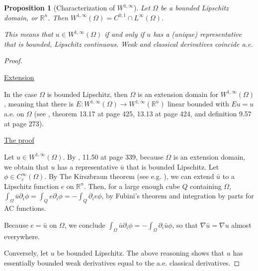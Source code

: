 \documentclass[english,a4paper,12pt,oneside]{scrbook}
\theoremstyle{break}
\newtheorem{prop}[equation]{Proposition}
\newenvironment{mproof}[1][\proofname]{%
  \begin{proof}[#1]$ $\par\nobreak\ignorespaces
}{%
  \end{proof}
}
\renewcommand*{\proofname}{Proof}
\theoremstyle{remark}
\newcommand{\ds}{\displaystyle}
\newcommand{\cc}{\subset\subset}
\begin{document}
\begin{prop}[Characterization of $W^{1,\infty}$]
\label{prop:lip}
Let $\Omega$ be a bounded Lipschitz domain, or $\mathbb{R}^n$. Then $W^{1,\infty}(\Omega) = C^{0,1}\cap L^\infty(\Omega)$.

This means that $u\in W^{1,\infty}(\Omega)$ if and only if $u$ has a (unique) representative that is bounded, Lipschitz continuous. Weak and classical derivatives coincide a.e.
\end{prop}
\begin{mproof}

%
%
%
%

\underline{Extension}

In the case $\Omega$ is bounded Lipschitz, then $\Omega$ is an extension domain for $W^{1,\infty}(\Omega)$, meaning that there is $E: W^{1,\infty}(\Omega)\rightarrow W^{1,\infty}(\mathbb{R}^n)$ linear bounded with $Eu=u$ a.e. on $\Omega$ (see \cite{leoni}, theorem 13.17 at page 425, 13.13 at page 424, and definition 9.57 at page 273).

\underline{The proof}

Let $u \in  W^{1,\infty}(\Omega)$. By \cite{leoni}, 11.50 at page 339, because $\Omega$ is an extension domain, we obtain that $u$ has a representative $\bar{u}$ that is bounded Lipschitz. Let $\phi \in C_c^\infty(\Omega)$. By The Kirszbraun theorem (see e.g. \cite{kirszbraun}), we can extend $\bar{u}$ to a Lipschitz function $e$ on $\mathbb{R}^n$. Then, for a large enough cube $Q$ containing $\Omega$, $\ds \int_\Omega\bar{u}\partial_i\phi = \int_Q e \partial_i \phi  = -\int_Q \partial_i e \phi $, by Fubini's theorem and integration by parts for AC functions.

Because $e=\bar{u}$	on $\Omega$, we conclude $\ds \int_\Omega\bar{u}\partial_i\phi =-\int_{\Omega} \partial_i \bar{u} \phi $, so that $\nabla \bar{u} = \nabla u$ almost everywhere.

Conversely, let $u$ be bounded Lipschitz. The above reasoning shows that $u$ has essentially bounded weak derivatives equal to the a.e. classical derivatives.

\end{mproof}
\end{document}

